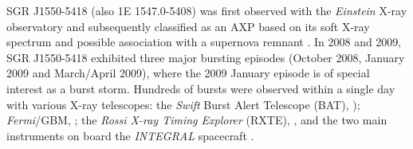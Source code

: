 \documentclass[12pt]{emulateapj}
\newcommand{\project}[1]{\textsl{#1}}
\newcommand{\fermi}{\project{Fermi}}
\begin{document}
SGR J1550-5418 (also 1E 1547.0-5408) was first observed with the {\it Einstein} X-ray observatory \citep{lamb1981}
and subsequently classified as an AXP based on its soft X-ray spectrum and possible association with a supernova remnant \citep{gelfand2007}.
In 2008 and 2009, SGR J1550-5418 exhibited three major bursting episodes (October 2008, January 2009 and March/April 2009), where the 2009 January episode is of special interest as a
burst storm. Hundreds of bursts were observed within a single day with various X-ray telescopes: the {\it Swift} Burst Alert Telescope (BAT), \citep{israel2010, scholz2011}); \fermi/GBM, \citep{kaneko2010,vonkienlin2012,vanderhorst2012}; the {\it Rossi X-ray Timing Explorer} (RXTE), \citep{dib2012}, and the two main instruments on board the {\it INTEGRAL} spacecraft \citep{mereghetti2009, savchenko2010}.
 
\end{document}
